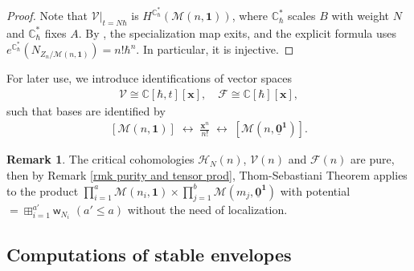 \documentclass[10pt]{amsart}
\theoremstyle{definition}
\newtheorem{Remark}[Theorem]{Remark}
\numberwithin{equation}{section}
\newcommand{\bC}{\mathbb{C}}
\newcommand{\bd}{\mathbf{d}}
\newcommand{\cF}{\mathcal{F}}
\newcommand{\cH}{\mathcal{H}}
\newcommand{\cM}{\mathcal{M}}
\newcommand{\cV}{\mathcal{V}}
\newcommand{\sw}{\mathsf{w}}
\begin{document}
\begin{proof}
Note that $\mathcal V|_{t=N\hbar}$ is $H^{\bC^*_\hbar}(\cM(n,\mathbf 1))$, where $\bC^*_\hbar$ scales $B$ with weight $N$ and $\bC^*_\hbar$ fixes $A$. By 
\cite[Ex.~7.19]{COZZ}, the specialization map exits, and the explicit formula uses $e^{\bC^*_\hbar}(N_{Z_n/\cM(n,\mathbf 1)})=n!\hbar^n$. In particular, it is injective.
\end{proof}
For later use, we introduce identifications of vector spaces 
\begin{align*}
    \mathcal V\cong \bC[\hbar,t][\mathbf x],\quad \mathcal F\cong \bC[\hbar][\mathbf x],
\end{align*}
such that bases are identified by
\begin{align}\label{bases of V and F}
    [\cM(n,\mathbf 1)]\;\longleftrightarrow \;\frac{\mathbf x^n}{n!}\;\longleftrightarrow \;[\cM(n,\underline{\mathbf 0}^{\mathbf 1})].
\end{align}


\begin{Remark}
The critical cohomologies $\cH_N(n)$, $\cV(n)$ and $\cF(n)$ are pure, then by Remark \ref{rmk purity and tensor prod}, Thom-Sebastiani Theorem applies to the product $\prod_{i=1}^a\cM(n_i,\mathbf 1)\times \prod_{j=1}^b\cM(m_j,\underline{\mathbf 0}^{\mathbf 1})$ with potential $=\boxplus_{i=1}^{a'} \sw_{N_i}$ $(a'\leqslant a)$ without the need of localization.
\end{Remark}




\subsection{Computations of stable envelopes}\label{sect on comp stab of gl2}
\end{document}
